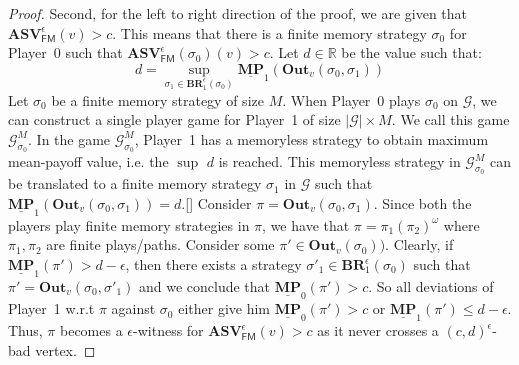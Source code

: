 \begin{proof}
	Second, for the left to right direction of the proof, we are given that $\mathbf{ASV}_{\mathsf{FM}}^{\epsilon}(v) > c$. This means that there is a finite memory strategy $\sigma_0$ for Player~0 such that $\mathbf{ASV}_{\mathsf{FM}}^{\epsilon}(\sigma_0)(v) > c$. Let $d \in \mathbb{R}$ be the value such that:
	\begin{equation*}
	    d = \sup\limits_{\sigma_1 \in \mathbf{BR}_1^{\epsilon}(\sigma_0)} \underline{\mathbf{MP}}_1(\mathbf{Out}_v(\sigma_0, \sigma_1))
	\end{equation*}
	Let $\sigma_0$ be a finite memory strategy of size $M$. When Player~0 plays $\sigma_0$ on $\mathcal{G}$, we can construct a single player game for Player~1 of size $|\mathcal{G}|\times M$. We call this game $\mathcal{G}^M_{\sigma_0}$. In the game $\mathcal{G}^M_{\sigma_0}$, Player~1 has a memoryless strategy to obtain maximum mean-payoff value, i.e. the $\sup$ $d$ is reached. This memoryless strategy in $\mathcal{G}^M_{\sigma_0}$ can be translated to a finite memory strategy $\sigma_1$ in $\mathcal{G}$ such that $\underline{\mathbf{MP}}_1(\mathbf{Out}_v(\sigma_0, \sigma_1)) = d$.[]
	Consider $\pi = \mathbf{Out}_v(\sigma_0, \sigma_1)$. Since both the players play finite memory strategies in $\pi$, we have that $\pi = \pi_1(\pi_2)^{\omega}$ where $\pi_1, \pi_2$ are finite plays/paths. Consider some $\pi' \in \mathbf{Out}_v(\sigma_0))$. Clearly, if $\underline{\mathbf{MP}}_1(\pi') > d-\epsilon$, then there exists a strategy $\sigma'_1 \in \mathbf{BR}_1^{\epsilon}(\sigma_0)$ such that $\pi' = \mathbf{Out}_v(\sigma_0, \sigma'_1)$ and we conclude that $\underline{\mathbf{MP}}_0(\pi') > c$. So all deviations of Player~1 w.r.t $\pi$ against $\sigma_0$ either give him $\underline{\mathbf{MP}}_0(\pi') > c$ or $\underline{\mathbf{MP}}_1(\pi') \leqslant d-\epsilon$. Thus, $\pi$ becomes a $\epsilon$-witness for $\mathbf{ASV}_{\mathsf{FM}}^{\epsilon}(v) > c$ as it never crosses a $(c,d)^{\epsilon}$-bad vertex.
\end{proof}